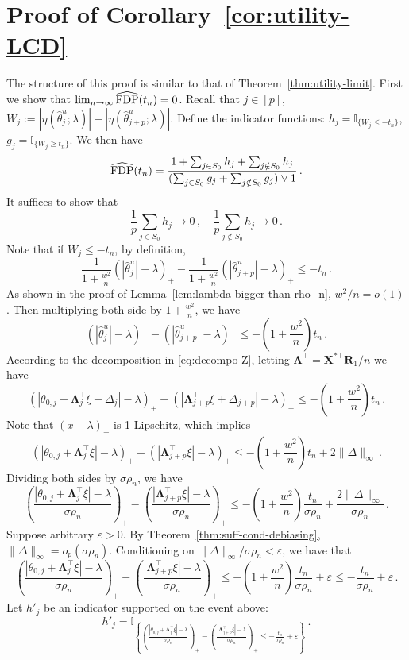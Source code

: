 \documentclass[11pt]{article}
\newcommand{\bX}{\boldsymbol{X}}
\newcommand{\bR}{\boldsymbol{R}}
\newcommand{\bLambda}{\boldsymbol{\Lambda}}
\newcommand{\FDP}{{\rm FDP}}
\newcommand{\hth}{\widehat{\theta}}
\begin{document}
\section{Proof of Corollary~\ref{cor:utility-LCD}}\label{pf:utility-LCD}
The structure of this proof is similar to that of Theorem~\ref{thm:utility-limit}. First we show that $\lim_{n\to\infty}\widehat \FDP(t_n) = 0$. Recall that $j\in[p]$, $W_j :=|\eta(\hth^u_j;\lambda)|-|\eta(\hth^u_{j+p};\lambda)|$. Define the indicator functions: $ h_j = \mathbb I_{\{W_j\leq -t_n\}}$, $ g_j= \mathbb I_{\{W_j\geq t_n\}}$. We then have
\[
\widehat{\FDP}(t_n) = \frac{1+\sum_{j\in S_0}h_j+\sum_{j\notin S_0}h_j}{(\sum_{j\in S_0}g_j+\sum_{j\notin S_0}g_j)\vee 1}\,.
\]
It suffices to show that 
\[
\frac{1}{p}\sum_{j\in S_0}h_j\to0\,,\quad \frac{1}{p}\sum_{j\notin S_0}h_j\to0\,.
\]
Note that if $W_j\leq-t_n$, by definition,
\[
\frac{1}{1+\frac{w^2}{n}}(|\hth^u_j|-\lambda)_+-\frac{1}{1+\frac{w^2}{n}}(|\hth^u_{j+p}|-\lambda)_+\leq -t_n\,.
\]
As shown in the proof of Lemma~\ref{lem:lambda-bigger-than-rho_n}, $w^2/n = o(1)$. Then multiplying both side by $1+\frac{w^2}{n}$, we have
\[
(|\hth^u_j|-\lambda)_+-(|\hth^u_{j+p}|-\lambda)_+\leq -\left(1+\frac{w^2}{n}\right)t_n\,.
\]
According to the decomposition in \eqref{eq:decompo-Z}, letting $\bLambda^\top = \bX^{*\top}\bR_1/n$ we have
\[
(|\theta_{0,j}+\bLambda_j^\top\xi+\Delta_j|-\lambda)_+-(|\bLambda_{j+p}^\top\xi+\Delta_{j+p}|-\lambda)_+\leq -\left(1+\frac{w^2}{n}\right)t_n\,.
\]
Note that $(x-\lambda)_+$ is 1-Lipschitz, which implies
\[
(|\theta_{0,j}+\bLambda_j^\top\xi|-\lambda)_+-(|\bLambda_{j+p}^\top\xi|-\lambda)_+\leq -\left(1+\frac{w^2}{n}\right)t_n+2\|\Delta\|_\infty\,.
\]
Dividing both sides by $\sigma\rho_n$, we have
\[
\left(\frac{|\theta_{0,j}+\bLambda_j^\top\xi|-\lambda}{\sigma\rho_n}\right)_+-\left(\frac{|\bLambda_{j+p}^\top\xi|-\lambda}{\sigma\rho_n}\right)_+\leq -\left(1+\frac{w^2}{n}\right)\frac{t_n}{\sigma\rho_n}+\frac{2\|\Delta\|_\infty}{\sigma\rho_n}\,.
\]
Suppose arbitrary $\varepsilon>0$. By Theorem~\ref{thm:suff-cond-debiasing}, $\|\Delta\|_\infty=o_p(\sigma\rho_n)$. Conditioning on $\|\Delta\|_\infty/\sigma\rho_n<\varepsilon$, we have that
\[
\left(\frac{|\theta_{0,j}+\bLambda_j^\top\xi|-\lambda}{\sigma\rho_n}\right)_+-\left(\frac{|\bLambda_{j+p}^\top\xi|-\lambda}{\sigma\rho_n}\right)_+\leq -\left(1+\frac{w^2}{n}\right)\frac{t_n}{\sigma\rho_n}  +\varepsilon\le-\frac{t_n}{\sigma\rho_n}+\varepsilon\,.
\]
Let $h'_j$ be an indicator supported on the event above:
\[
h'_j = \mathbb I_{\left\{\left(\frac{|\theta_{0,j}+\bLambda_j^\top\xi|-\lambda}{\sigma\rho_n}\right)_+-\left(\frac{|\bLambda_{j+p}^\top\xi|-\lambda}{\sigma\rho_n}\right)_+\leq -\frac{t_n}{\sigma\rho_n}+\varepsilon\right\}}\,.
\]
\end{document}
